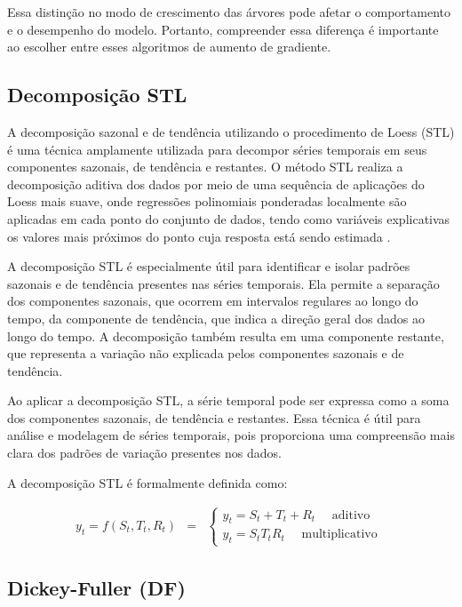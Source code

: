 Essa distinção no modo de crescimento das árvores pode afetar o comportamento e o desempenho do modelo. Portanto, compreender essa diferença é importante ao escolher entre esses algoritmos de aumento de gradiente.

\subsection{Decomposi\c c\~ao STL}

A decomposição sazonal e de tendência utilizando o procedimento de Loess (STL) é uma técnica amplamente utilizada para decompor séries temporais em seus componentes sazonais, de tendência e restantes. O método STL realiza a decomposição aditiva dos dados por meio de uma sequência de aplicações do Loess mais suave, onde regressões polinomiais ponderadas localmente são aplicadas em cada ponto do conjunto de dados, tendo como variáveis explicativas os valores mais próximos do ponto cuja resposta está sendo estimada \cite{Theodosiou20111178}.

A decomposição STL é especialmente útil para identificar e isolar padrões sazonais e de tendência presentes nas séries temporais. Ela permite a separação dos componentes sazonais, que ocorrem em intervalos regulares ao longo do tempo, da componente de tendência, que indica a direção geral dos dados ao longo do tempo. A decomposição também resulta em uma componente restante, que representa a variação não explicada pelos componentes sazonais e de tendência.

Ao aplicar a decomposição STL, a série temporal pode ser expressa como a soma dos componentes sazonais, de tendência e restantes. Essa técnica é útil para análise e modelagem de séries temporais, pois proporciona uma compreensão mais clara dos padrões de variação presentes nos dados.

A decomposição STL é formalmente definida como:

\begin{eqnarray}
	y_t=f\left(S_t, T_t, R_t\right)&=&\left\{\begin{array}{l}
		y_t=S_t+T_t+R_t \quad \text { aditivo } \\
		y_t=S_t T_t R_t \quad \text { multiplicativo }
	\end{array}\right. \label{eq:stl}
\end{eqnarray}

\subsection{Dickey-Fuller (DF)}

